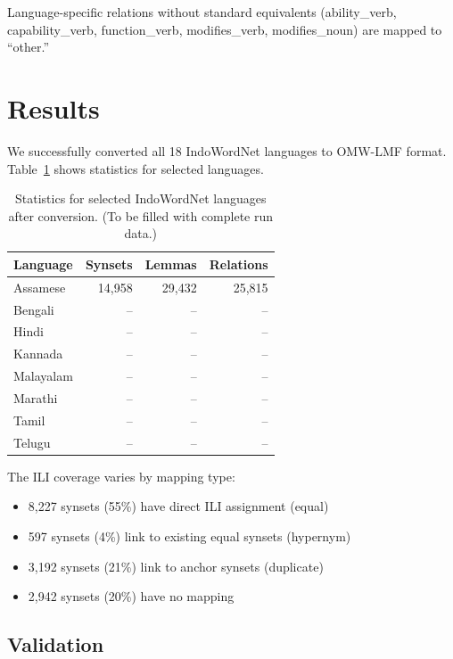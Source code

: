 \documentclass[11pt]{article}
\begin{document}
Language-specific relations without standard equivalents (ability\_verb, capability\_verb, function\_verb, modifies\_verb, modifies\_noun) are mapped to ``other.''

\section{Results}

We successfully converted all 18 IndoWordNet languages to OMW-LMF format.
Table~\ref{tab:language-stats} shows statistics for selected languages.




\begin{table}[t]
\centering
\small
\begin{tabular}{lrrr}
\toprule
\textbf{Language} & \textbf{Synsets} & \textbf{Lemmas} & \textbf{Relations} \\
\midrule
Assamese & 14,958 & 29,432 & 25,815 \\
Bengali & -- & -- & -- \\
Hindi & -- & -- & -- \\
Kannada & -- & -- & -- \\
Malayalam & -- & -- & -- \\
Marathi & -- & -- & -- \\
Tamil & -- & -- & -- \\
Telugu & -- & -- & -- \\
\bottomrule
\end{tabular}
\caption{Statistics for selected IndoWordNet languages after conversion. (To be filled with complete run data.)}
\label{tab:language-stats}
\end{table}

The ILI coverage varies by mapping type:
\begin{itemize}
\item 8,227 synsets (55\%) have direct ILI assignment (equal)
\item 597 synsets (4\%) link to existing equal synsets (hypernym)
\item 3,192 synsets (21\%) link to anchor synsets (duplicate)
\item 2,942 synsets (20\%) have no mapping
\end{itemize}

\subsection{Validation}
\end{document}
